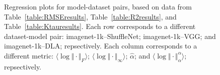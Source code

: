 \begin{figure}[t]
{        \label{fig:summary_regressions_B_10}
    }
    \caption{Regression plots for model-dataset pairs, based on data from Table~\ref{table:RMSEresults}, Table~\ref{table:R2results}, and Table~\ref{table:Ktauresults}.
             Each row corresponds to a different dataset-model pair:
             imagenet-1k--ShuffleNet;
             imagenet-1k--VGG;
             and
             imagenet-1k--DLA;
             repsectively.
             Each column corresponds to a different metric:
             $\langle\log\Vert\cdot\Vert_{F}\rangle$; 
             $\langle\log\Vert\cdot\Vert_{\infty}\rangle$; 
             $\hat{\alpha}$; 
             and
             $\langle\log\Vert\cdot\Vert^{\alpha}_{\alpha}\rangle$;
             repsectively.
            }
    \label{fig:summary_regressions_B}
\end{figure}

